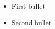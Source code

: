 \documentclass{article}
\begin{document}
\begin{itemize}
\item First bullet
\item Second bullet
\end{itemize}
\end{document}
